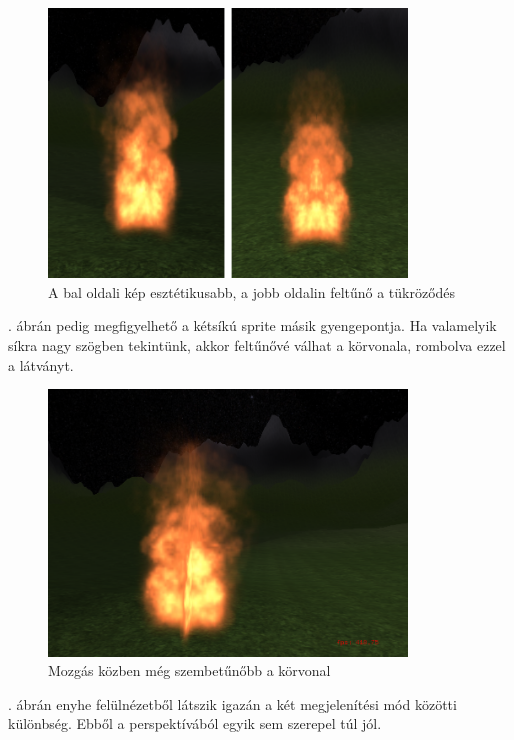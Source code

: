 \begin{figure}[h!]
 \centering
 \includegraphics[width=0.85\textwidth]{kepek/billboardFinal3.png}
 \caption{A bal oldali kép esztétikusabb, a jobb oldalin feltűnő a tükröződés}
 \label{fig:billboardFinal3}
\end{figure}

. ábrán pedig megfigyelhető a kétsíkú sprite másik gyengepontja. Ha valamelyik síkra nagy szögben tekintünk, akkor feltűnővé válhat a körvonala, rombolva ezzel a látványt.

\begin{figure}[h!]
 \centering
 \includegraphics[width=0.85\textwidth]{kepek/billboardFinal4.png}
 \caption{Mozgás közben még szembetűnőbb a körvonal}
 \label{fig:billboardFinal4}
\end{figure}

. ábrán enyhe felülnézetből látszik igazán a két megjelenítési mód közötti különbség. Ebből a perspektívából egyik sem szerepel túl jól.

